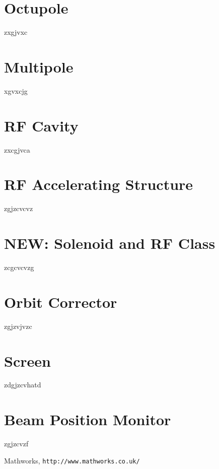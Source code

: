\documentclass[11pt,a4paper]{article}
\begin{document}
	\section{Octupole}
	zxgjvxc
	\section{Multipole}
	xgvxcjg
	\section{RF Cavity}
	zxcgjvca
	\section{RF Accelerating Structure}
	zgjzcvcvz
	\section{NEW: Solenoid and RF Class}
	zcgcvcvzg
	\section{Orbit Corrector}
	zgjzvjvzc
	\section{Screen}
	zdgjzcvhatd
	\section{Beam Position Monitor}
	zgjzcvzf
		
	\begin{thebibliography}{99}
		
		Mathworks, \texttt{http://www.mathworks.co.uk/}

		
	\end{thebibliography}
	
\end{document}
